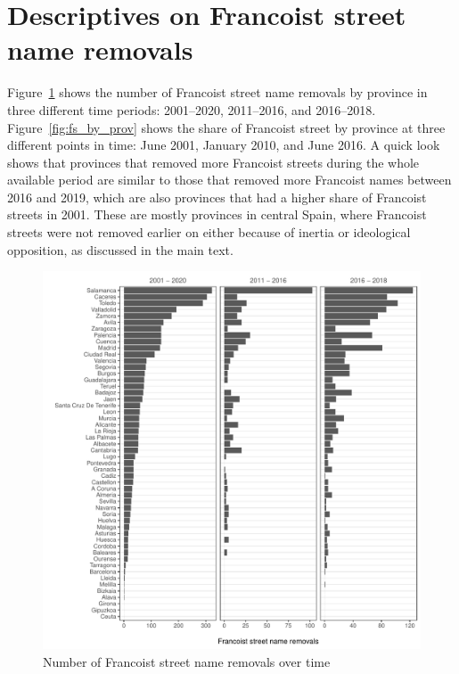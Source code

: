 \documentclass[12pt, titlepage]{article}
\begin{document}
\clearpage
\section{Descriptives on Francoist street name removals}\label{app:descriptives_removals}

Figure~\ref{fig:changes_by_prov} shows the number of Francoist street name removals by province in three different time periods: 2001--2020, 2011--2016, and 2016--2018.
Figure~\ref{fig:fs_by_prov} shows the share of Francoist street by province at three different points in time: June 2001, January 2010, and June 2016.
A quick look shows that provinces that removed more Francoist streets during the whole available period are similar to those that removed more Francoist names between 2016 and 2019, which are also provinces that had a higher share of Francoist streets in 2001.
These are mostly provinces in central Spain, where Francoist streets were not removed earlier on either because of inertia or ideological opposition, as discussed in the main text.

\begin{figure}[htb!]
\centering

  \includegraphics[width = \textwidth]{img/changes_by_prov}

  \caption{Number of Francoist street name removals over time}\label{fig:changes_by_prov}

\end{figure}
\end{document}
